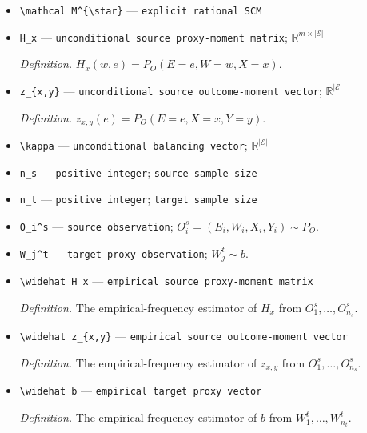 \documentclass{article}
\begin{document}
\begin{itemize}
  \item \texttt{\textbackslash{}\allowbreak{}mathcal M\textasciicircum{}\{\textbackslash{}\allowbreak{}star\}\allowbreak{}} --- \texttt{explicit rational SCM}
  \item \texttt{H\_\allowbreak{}x} --- \texttt{unconditional source proxy-\allowbreak{}moment matrix}; \(\mathbb R^{m\times\lvert\mathcal E\rvert}\)
  \par\smallskip\noindent\emph{Definition.} \(H_x(w,e)=P_O(E=e,W=w,X=x)\).
  \item \texttt{z\_\allowbreak{}\{x,\allowbreak{}y\}\allowbreak{}} --- \texttt{unconditional source outcome-\allowbreak{}moment vector}; \(\mathbb R^{\lvert\mathcal E\rvert}\)
  \par\smallskip\noindent\emph{Definition.} \(z_{x,y}(e)=P_O(E=e,X=x,Y=y)\).
  \item \texttt{\textbackslash{}\allowbreak{}kappa} --- \texttt{unconditional balancing vector}; \(\mathbb R^{\lvert\mathcal E\rvert}\)
  \item \texttt{n\_\allowbreak{}s} --- \texttt{positive integer}; \texttt{source sample size}
  \item \texttt{n\_\allowbreak{}t} --- \texttt{positive integer}; \texttt{target sample size}
  \item \texttt{O\_\allowbreak{}i\textasciicircum{}s} --- \texttt{source observation}; \(O_i^s=(E_i,W_i,X_i,Y_i)\sim P_O\).
  \item \texttt{W\_\allowbreak{}j\textasciicircum{}t} --- \texttt{target proxy observation}; \(W_j^t\sim b\).
  \item \texttt{\textbackslash{}\allowbreak{}widehat H\_\allowbreak{}x} --- \texttt{empirical source proxy-\allowbreak{}moment matrix}
  \par\smallskip\noindent\emph{Definition.} The empirical-frequency estimator of \(H_x\) from \(O_1^s,\ldots,O_{n_s}^s\).
  \item \texttt{\textbackslash{}\allowbreak{}widehat z\_\allowbreak{}\{x,\allowbreak{}y\}\allowbreak{}} --- \texttt{empirical source outcome-\allowbreak{}moment vector}
  \par\smallskip\noindent\emph{Definition.} The empirical-frequency estimator of \(z_{x,y}\) from \(O_1^s,\ldots,O_{n_s}^s\).
  \item \texttt{\textbackslash{}\allowbreak{}widehat b} --- \texttt{empirical target proxy vector}
  \par\smallskip\noindent\emph{Definition.} The empirical-frequency estimator of \(b\) from \(W_1^t,\ldots,W_{n_t}^t\).

\end{itemize}
\end{document}

